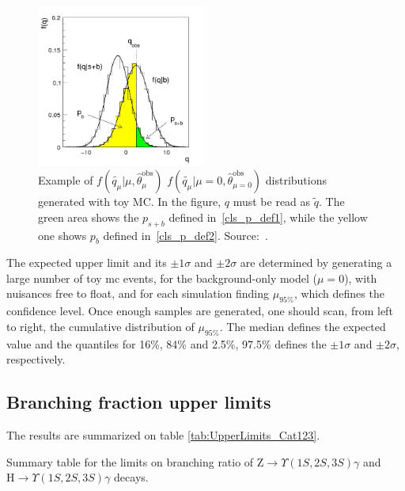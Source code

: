 \begin{figure}[htbp]
  \centering
  \includegraphics[width=0.5\textwidth,keepaspectratio]{figures_and_tables/cls/qtevDist.png}
  \caption{Example of $f(\tilde{q_{\mu}} \vert \mu, \hat{\theta}_{\mu}^{\text{obs}})$ $f(\tilde{q_{\mu}} \vert \mu=0, \hat{\theta}_{\mu = 0}^{\text{obs}})$ distributions generated with toy MC. In the figure, $q$ must be read as $\tilde{q}$. The green area shows the $p_{s+b}$ defined in~\ref{cls_p_def1}, while the yellow one shows $p_{b}$ defined in~\ref{cls_p_def2}. Source:~\cite{asymptotic_cls}.}
  \label{qtevDist}
\end{figure}

The expected upper limit and its $\pm 1 \sigma$ and $\pm 2 \sigma$ are determined by generating a large number of toy mc events, for the background-only model ($\mu = 0$), with nuisances free to float, and for each simulation finding $\mu_{95\%}$, which defines the confidence level. Once enough samples are generated, one should scan, from left to right, the cumulative distribution of $\mu_{95\%}$. The median defines the expected value and the quantiles for 16\%, 84\% and 2.5\%, 97.5\% defines the $\pm 1 \sigma$ and $\pm 2 \sigma$, respectively.

\subsection{Branching fraction upper limits}
\label{sec:results}
The results are summarized on table \ref{tab:UpperLimits_Cat123}.

\begin{table}[ht]
\begin{center}
\caption{Summary table for the limits on branching ratio of $\mathrm{Z}\to\Upsilon(1S,2S,3S)\gamma$ and $\mathrm{H}\to\Upsilon(1S,2S,3S)\gamma$ decays.}
% 

\label{tab:UpperLimits_Cat123}
\end{center}
\end{table}

